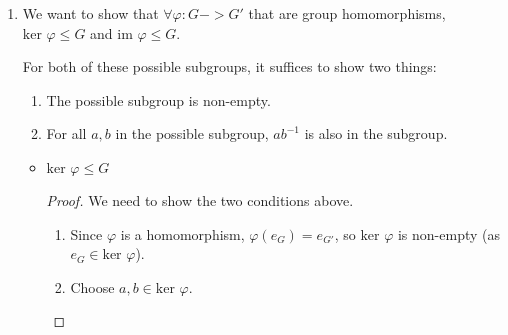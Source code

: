 \documentclass[12pt,letterpaper]{article}
\newcommand{\GLNR}[0]{GL_n(\mathbb{R})}
\newcommand{\KER}[1]{\text{ker }#1}
\newcommand{\IM}[1]{\text{im }#1}
\begin{document}
\begin{enumerate}
\begin{proof}
\begin{itemize}
            So we want to find all $A \in \GLNR$ such that $f(A) = (A^T)^{-1} = I_n$.

            But we know that for any group the identity is its own inverse, so $A^T = I_n$.

            We also know that $I_n^T = I_n$, so $A = I_n$.

            And since we know that the identity is unique,
            we have that $\text{ker } f = \{I_n\}$.

          \item
            Now we show that $\text{im } f = \GLNR$

            It suffices to show that $f$ has an inverse.
            Namely, $f^{-1}(A) = A^T$.
        \end{itemize}

        So, we have shown that $f : \GLNR \rightarrow \GLNR$ is an isomorphism.
        And since $f$'s domain is its co-domain, $f$ is an automorphism.
      \end{proof}

    \item
      We want to show that $\forall \varphi : G -> G'$ that are group homomorphisms,
      $\KER{\varphi} \le G$ and $\IM{\varphi} \le G$.

      For both of these possible subgroups, it suffices to show two things:
        \begin{enumerate}
          \item The possible subgroup is non-empty.
          \item For all $a, b$ in the possible subgroup, $ab^{-1}$ is also in the subgroup.
        \end{enumerate}

      \begin{itemize}
        \item $\KER{\varphi} \le G$

          \begin{proof}
            We need to show the two conditions above.

            \begin{enumerate}
              \item
                Since $\varphi$ is a homomorphism, $\varphi(e_G) = e_{G'}$,
                so $\KER{\varphi}$ is non-empty (as $e_G \in \KER{\varphi}$).
              \item
                Choose $a, b \in \KER{\varphi}$.


\end{enumerate}
\end{proof}
\end{itemize}
\end{enumerate}
\end{document}
